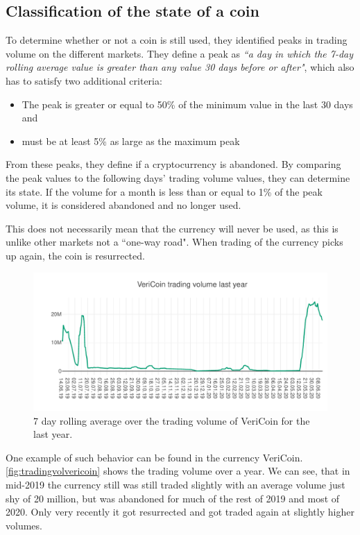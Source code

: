 \documentclass[11pt,a4paper,compsoc,conference]{IEEEtran}
\begin{document}
\subsection{Classification of the state of a coin}
To determine whether or not a coin is still used, they identified peaks in trading volume on the different markets. They define a peak as \textit{``a day in which the 7-day rolling average value is greater than any value 30 days before or after"}, which also has to satisfy two additional criteria:
\begin{itemize}
    \item The peak is greater or equal to 50\% of the minimum value in the last 30 days and
    \item must be at least 5\% as large as the maximum peak
\end{itemize}

From these peaks, they define if a cryptocurrency is abandoned. By comparing the peak values to the following days' trading volume values, they can determine its state. If the volume for a month is less than or equal to 1\% of the peak volume, it is considered abandoned and no longer used.

This does not necessarily mean that the currency will never be used, as this is unlike other markets not a ``one-way road". When trading of the currency picks up again, the coin is resurrected. 

\begin{figure}[ht]
    \centering
    \includegraphics[width=\linewidth]{figures/diagram-20200614.pdf}
    \caption[Trading volume of VeriCoin]{7 day rolling average over the trading volume of VeriCoin for the last year.}
    \label{fig:tradingvolvericoin}
\end{figure}


One example of such behavior can be found in the currency VeriCoin. \autoref{fig:tradingvolvericoin} shows the trading volume over a year. We can see, that in mid-2019 the currency still was still traded slightly with an average volume just shy of 20 million, but was abandoned for much of the rest of 2019 and most of 2020. Only very recently it got resurrected and got traded again at slightly higher volumes. 
\end{document}

